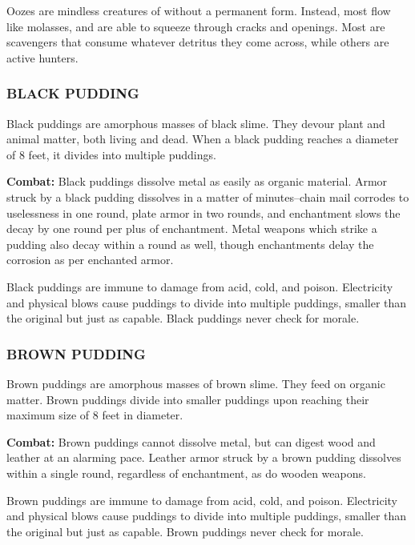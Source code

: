 \begin{multicols}{2}

Oozes are mindless creatures of without a permanent form. Instead, most flow like molasses, and are able to squeeze through cracks and openings. Most are scavengers that consume whatever detritus they come across, while others are active hunters.

\subsubsection{BLACK PUDDING}

Black puddings are amorphous masses of black slime. They devour plant and animal matter, both living and dead. When a black pudding reaches a diameter of 8 feet, it divides into multiple puddings.

\textbf{Combat:} Black puddings dissolve metal as easily as organic material. Armor struck by a black pudding dissolves in a matter of minutes--chain mail corrodes to uselessness in one round, plate armor in two rounds, and enchantment slows the decay by one round per plus of enchantment. Metal weapons which strike a pudding also decay within a round as well, though enchantments delay the corrosion as per enchanted armor.

Black puddings are immune to damage from acid, cold, and poison. Electricity and physical blows cause puddings to divide into multiple puddings, smaller than the original but just as capable. Black puddings never check for morale.

\subsubsection{BROWN PUDDING}

Brown puddings are amorphous masses of brown slime. They feed on organic matter. Brown puddings divide into smaller puddings upon reaching their maximum size of 8 feet in diameter.

\textbf{Combat:} Brown puddings cannot dissolve metal, but can digest wood and leather at an alarming pace. Leather armor struck by a brown pudding dissolves within a single round, regardless of enchantment, as do wooden weapons.

Brown puddings are immune to damage from acid, cold, and poison. Electricity and physical blows cause puddings to divide into multiple puddings, smaller than the original but just as capable. Brown puddings never check for morale.


\end{multicols}
